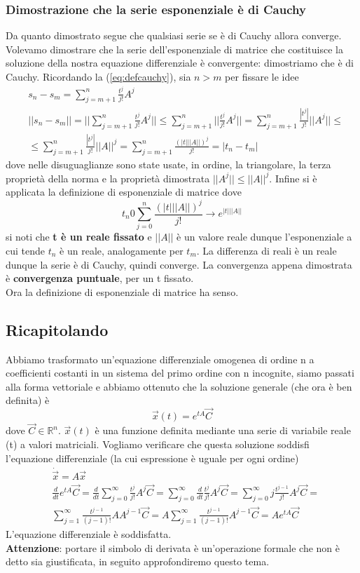 \documentclass[10pt,a4paper]{article}
\begin{document}
\subsubsection{Dimostrazione che la serie esponenziale è di Cauchy}
Da quanto dimostrato segue che qualsiasi serie se è di Cauchy allora converge. Volevamo dimostrare che la serie dell'esponenziale di matrice che costituisce la soluzione della nostra equazione differenziale è convergente: dimostriamo che è di Cauchy. Ricordando la (\ref{eq:defcauchy}), sia \(n > m\) per fissare le idee
\begin{align*}
	&s_n - s_m = \sum_{j = m+1}^{n}\frac{t^j }{j!}A^j\\
	&||s_n - s_m|| = ||\sum_{j = m+1}^{n}\frac{t^j }{j!}A^j|| \leq \sum_{j = m+1}^{n}||\frac{t^j }{j!}A^j|| = \sum_{j = m+1}^{n}\frac{|t^j| }{j!}||A^j||\leq\\
	&\leq \sum_{j = m+1}^{n}\frac{|t^j| }{j!}||A||^j = \sum_{j = m+1}^{n}\frac{(|t|||A||)^j }{j!} = |t_n - t_m|
\end{align*}
dove nelle disuguaglianze sono state usate, in ordine, la triangolare, la terza proprietà della norma e la proprietà dimostrata \(||A^j||\leq||A||^j\). Infine si è applicata la definizione di esponenziale di matrice dove
\[ t_n 0 \sum_{j=0}^{n}\frac{(|t|||A||)^j }{j!}\rightarrow e^{|t| ||A||}\]
si noti che \textbf{t è un reale fissato} e \(||A||\) è un valore reale dunque l'esponenziale a cui tende \(t_n\) è un reale, analogamente per \(t_m\). La differenza di reali è un reale dunque la serie è di Cauchy, quindi converge. La convergenza appena dimostrata è \textbf{convergenza puntuale}, per un t fissato.\\
Ora la definizione di esponenziale di matrice ha senso.

\subsection{Ricapitolando}
Abbiamo trasformato un'equazione differenziale omogenea di ordine n a coefficienti costanti in un sistema del primo ordine con n incognite, siamo passati alla forma vettoriale e abbiamo ottenuto che la soluzione generale (che ora è ben definita) è
\[\vec{x}(t) = e^{tA}\vec{C}\]
dove $\vec{C}\in \mathbb{R}^n$. $\vec{x}(t)$ è una funzione definita mediante una serie di variabile reale (t) a valori matriciali. Vogliamo verificare che questa soluzione soddisfi l'equazione differenziale (la cui espressione è uguale per ogni ordine)
\begin{align*}
	&\dot{\vec{x}} = A \vec{x}\\
	&\frac{d}{dt}e^{tA}\vec{C} =\frac{d}{dt}\sum_{j=0}^{\infty}\frac{t^j}{j!}A^j \vec{C} = \sum_{j=0}^{\infty}\frac{d}{dt}\frac{t^j}{j!}A^j \vec{C}=\sum_{j=0}^{\infty}j\frac{t^{j-1}}{j!}A^j \vec{C}=\\
	&\sum_{j=1}^{\infty}\frac{t^{j-1}}{(j-1)!}A A^{j-1}\vec{C} = A \sum_{j=1}^{\infty}\frac{t^{j-1}}{(j-1)!}A^{j-1}\vec{C} = Ae^{tA}\vec{C}
\end{align*}
L'equazione differenziale è soddisfatta.\\
\textbf{Attenzione}: portare il simbolo di derivata è un'operazione formale che non è detto sia giustificata, in seguito approfondiremo questo tema. 
\end{document}
